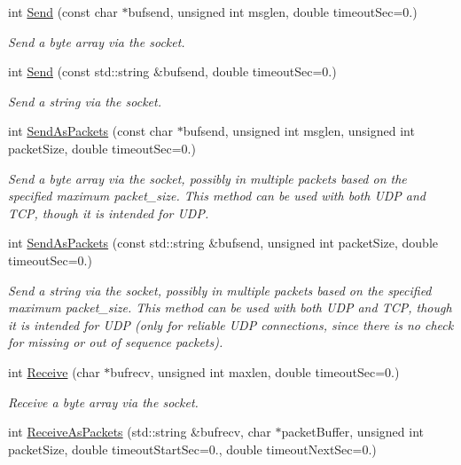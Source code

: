 \begin{DoxyCompactItemize}
int \hyperlink{classosa_socket_abf9a255ce888e52f7be1098f651acacd}{Send} (const char $\ast$bufsend, unsigned int msglen, double timeout\-Sec=0.)
\begin{DoxyCompactList}\small\item\em Send a byte array via the socket. \end{DoxyCompactList}\item 
int \hyperlink{classosa_socket_ae0e52036f8cf0a4896e1631696ab8001}{Send} (const std\-::string \&bufsend, double timeout\-Sec=0.)
\begin{DoxyCompactList}\small\item\em Send a string via the socket. \end{DoxyCompactList}\item 
int \hyperlink{classosa_socket_a734960e3f31352ecce882c55638e219b}{Send\-As\-Packets} (const char $\ast$bufsend, unsigned int msglen, unsigned int packet\-Size, double timeout\-Sec=0.)
\begin{DoxyCompactList}\small\item\em Send a byte array via the socket, possibly in multiple packets based on the specified maximum packet\-\_\-size. This method can be used with both U\-D\-P and T\-C\-P, though it is intended for U\-D\-P. \end{DoxyCompactList}\item 
int \hyperlink{classosa_socket_ac13c453c4f62e562e38a391725992232}{Send\-As\-Packets} (const std\-::string \&bufsend, unsigned int packet\-Size, double timeout\-Sec=0.)
\begin{DoxyCompactList}\small\item\em Send a string via the socket, possibly in multiple packets based on the specified maximum packet\-\_\-size. This method can be used with both U\-D\-P and T\-C\-P, though it is intended for U\-D\-P (only for reliable U\-D\-P connections, since there is no check for missing or out of sequence packets). \end{DoxyCompactList}\item 
int \hyperlink{classosa_socket_a76241adc0e7a67b5dfae17f81e2728ac}{Receive} (char $\ast$bufrecv, unsigned int maxlen, double timeout\-Sec=0.)
\begin{DoxyCompactList}\small\item\em Receive a byte array via the socket. \end{DoxyCompactList}\item 
int \hyperlink{classosa_socket_afcbcb441431d78b8887c8c6af9998f7e}{Receive\-As\-Packets} (std\-::string \&bufrecv, char $\ast$packet\-Buffer, unsigned int packet\-Size, double timeout\-Start\-Sec=0., double timeout\-Next\-Sec=0.)

\end{DoxyCompactItemize}

